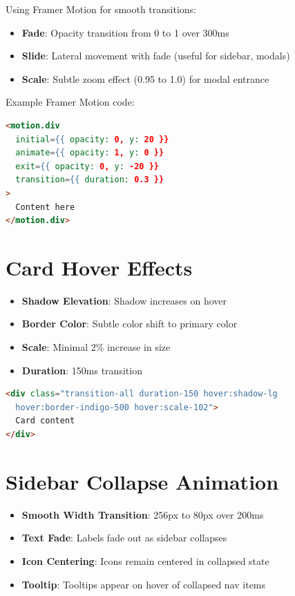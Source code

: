 \documentclass{report}
\begin{document}
Using Framer Motion for smooth transitions:

\begin{itemize}
    \item \textbf{Fade}: Opacity transition from 0 to 1 over 300ms
    \item \textbf{Slide}: Lateral movement with fade (useful for sidebar, modals)
    \item \textbf{Scale}: Subtle zoom effect (0.95 to 1.0) for modal entrance
\end{itemize}

Example Framer Motion code:

\begin{lstlisting}[language=HTML]
<motion.div
  initial={{ opacity: 0, y: 20 }}
  animate={{ opacity: 1, y: 0 }}
  exit={{ opacity: 0, y: -20 }}
  transition={{ duration: 0.3 }}
>
  Content here
</motion.div>
\end{lstlisting}

\section{Card Hover Effects}

\begin{itemize}
    \item \textbf{Shadow Elevation}: Shadow increases on hover
    \item \textbf{Border Color}: Subtle color shift to primary color
    \item \textbf{Scale}: Minimal 2\% increase in size
    \item \textbf{Duration}: 150ms transition
\end{itemize}

\begin{lstlisting}[language=HTML]
<div class="transition-all duration-150 hover:shadow-lg 
  hover:border-indigo-500 hover:scale-102">
  Card content
</div>
\end{lstlisting}

\section{Sidebar Collapse Animation}

\begin{itemize}
    \item \textbf{Smooth Width Transition}: 256px to 80px over 200ms
    \item \textbf{Text Fade}: Labels fade out as sidebar collapses
    \item \textbf{Icon Centering}: Icons remain centered in collapsed state
    \item \textbf{Tooltip}: Tooltips appear on hover of collapsed nav items
\end{itemize}
\end{document}
